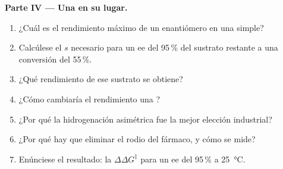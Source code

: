 \begin{problem}
\medskip\noindent\textbf{Parte IV --- Una  en su lugar.}
\begin{enumerate}[resume]
  \item ¿Cuál es el rendimiento máximo de un enantiómero en una  simple?
  \item Calcúlese el $s$ necesario para un ee del 95\,\% del sustrato restante a una conversión del 55\,\%.
  \item ¿Qué rendimiento de ese sustrato se obtiene?
  \item ¿Cómo cambiaría el rendimiento una ?
  \item ¿Por qué la hidrogenación asimétrica fue la mejor elección industrial?
  \item ¿Por qué hay que eliminar el rodio del fármaco, y cómo se mide?
  \item Enúnciese el resultado: la $\Delta\Delta G^\ddagger$ para un ee del 95\,\% a \qty{25}{\celsius}.
\end{enumerate}
\end{problem}
